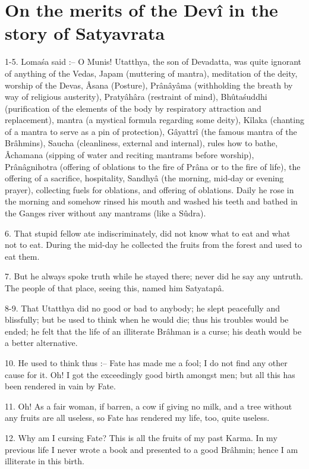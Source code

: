 ﻿\chapter{On the merits of the Dev\^i in the story of Satyavrata}

1-5. Loma\'sa said :-- O Munis! Utatthya, the son of Devadatta, was quite ignorant of anything of the Vedas, Japam (muttering of mantra), meditation of the deity, worship of the Devas, Âsana (Posture), Pr\^an\^ay\^ama (withholding the breath by way of religious austerity), Praty\^ah\^ara (restraint of mind), Bhûta\'suddhi (purification of the elements of the body by respiratory attraction and replacement), mantra (a mystical formula regarding some deity), K\^ilaka (chanting of a mantra to serve as a pin of protection), G\^ayattr\^i (the famous mantra of the Br\^ahmins), Saucha (cleanliness, external and internal), rules how to bathe, Âchamana (sipping of water and reciting mantrams before worship), Pr\^an\^agnihotra (offering of oblations to the fire of Pr\^ana or to the fire of life), the offering of a sacrifice, hospitality, Sandhy\^a (the morning, mid-day or evening prayer), collecting fuels for oblations, and offering of oblations. Daily he rose in the morning and somehow rinsed his mouth and washed his teeth and bathed in the Ganges river without any mantrams (like a Sûdra).

6. That stupid fellow ate indiscriminately, did not know what to eat and what not to eat. During the mid-day he collected the fruits from the forest and used to eat them.

7. But he always spoke truth while he stayed there; never did he say any untruth. The people of that place, seeing this, named him Satyatap\^a.

8-9. That Utatthya did no good or bad to anybody; he slept peacefully and blissfully; but be used to think when he would die; thus his troubles would be ended; he felt that the life of an illiterate Br\^ahman is a curse; his death would be a better alternative.

10. He used to think thus :-- Fate has made me a fool; I do not find any other cause for it. Oh! I got the exceedingly good birth amongst men; but all this has been rendered in vain by Fate.

11. Oh! As a fair woman, if barren, a cow if giving no milk, and a tree without any fruits are all useless, so Fate has rendered my life, too, quite useless.

12. Why am I cursing Fate? This is all the fruits of my past Karma. In my previous life I never wrote a book and presented to a good Br\^ahmin; hence I am illiterate in this birth.


